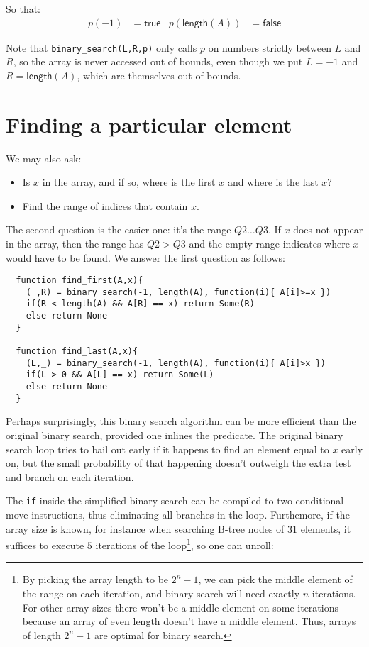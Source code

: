 \documentclass[a4paper, 11pt]{article}
\begin{document}
So that:
\begin{align*}
  p(-1) &= \mathsf{true} & p(\mathsf{length}(A)) &= \mathsf{false}
\end{align*}

Note that \lstinline|binary_search(L,R,p)| only calls $p$ on numbers strictly between $L$ and $R$, so the array is never accessed out of bounds, even though we put $L=-1$ and $R=\mathsf{length}(A)$, which are themselves out of bounds.

\section{Finding a particular element}

We may also ask:

\begin{itemize}
  \item Is $x$ in the array, and if so, where is the first $x$ and where is the last $x$?
  \item Find the range of indices that contain $x$.
\end{itemize}

\noindent The second question is the easier one: it's the range $Q2\dots Q3$. If $x$ does not appear in the array, then the range has $Q2 > Q3$ and the empty range indicates where $x$ would have to be found. We answer the first question as follows:

\begin{lstlisting}
  function find_first(A,x){
    (_,R) = binary_search(-1, length(A), function(i){ A[i]>=x })
    if(R < length(A) && A[R] == x) return Some(R)
    else return None
  }

  function find_last(A,x){
    (L,_) = binary_search(-1, length(A), function(i){ A[i]>x })
    if(L > 0 && A[L] == x) return Some(L)
    else return None
  }
\end{lstlisting}

Perhaps surprisingly, this binary search algorithm can be more efficient than the original binary search, provided one inlines the predicate. The original binary search loop tries to bail out early if it happens to find an element equal to $x$ early on, but the small probability of that happening doesn't outweigh the extra test and branch on each iteration.

The \lstinline|if| inside the simplified binary search can be compiled to two conditional move instructions, thus eliminating all branches in the loop. Furthemore, if the array size is known, for instance when searching B-tree nodes of 31 elements, it suffices to execute $5$ iterations of the loop\footnote{By picking the array length to be $2^n - 1$, we can pick the middle element of the range on each iteration, and binary search will need exactly $n$ iterations. For other array sizes there won't be a middle element on some iterations because an array of even length doesn't have a middle element. Thus, arrays of length $2^n - 1$ are optimal for binary search.}, so one can unroll:
\end{document}
